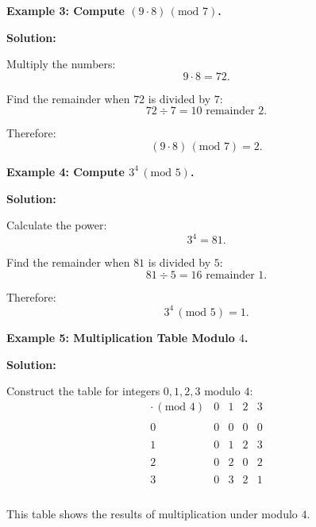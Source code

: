 \begin{flushleft}
\textbf{Example 3: Compute $(9 \cdot 8) \,(\text{mod } 7)$.}

\vspace{0.5cm}
\textbf{Solution:}
\vspace{0.5cm}

Multiply the numbers:
\[
9 \cdot 8 = 72.
\]

Find the remainder when $72$ is divided by $7$:
\[
72 \div 7 = 10 \text{ remainder } 2.
\]

Therefore:
\[
(9 \cdot 8) \,(\text{mod } 7) = 2.
\]
\end{flushleft}

\begin{flushleft}
\textbf{Example 4: Compute $3^4 \,(\text{mod } 5)$.}

\vspace{0.5cm}
\textbf{Solution:}
\vspace{0.5cm}

Calculate the power:
\[
3^4 = 81.
\]

Find the remainder when $81$ is divided by $5$:
\[
81 \div 5 = 16 \text{ remainder } 1.
\]

Therefore:
\[
3^4 \,(\text{mod } 5) = 1.
\]
\end{flushleft}

\begin{flushleft}
\textbf{Example 5: Multiplication Table Modulo $4$.}

\vspace{0.5cm}
\textbf{Solution:}
\vspace{0.5cm}

Construct the table for integers $0, 1, 2, 3$ modulo $4$:
\[
\begin{array}{c|cccc}
\cdot \,(\text{mod } 4) & 0 & 1 & 2 & 3 \\\\ \hline
0 & 0 & 0 & 0 & 0 \\\\
1 & 0 & 1 & 2 & 3 \\\\
2 & 0 & 2 & 0 & 2 \\\\
3 & 0 & 3 & 2 & 1 \\\\
\end{array}
\]

This table shows the results of multiplication under modulo $4$.
\end{flushleft}
